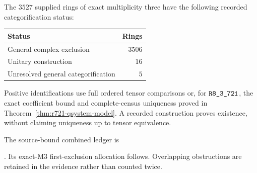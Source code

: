 \begin{theorem}\label{thm:m3-current}
The $3527$ supplied rings of exact multiplicity three have the following
recorded categorification status:
\begin{center}\begin{tabular}{@{}lr@{}}\toprule
Status & Rings\\\midrule
General complex exclusion & $3506$\\
Unitary construction & $16$\\
Unresolved general categorification & $5$\\
\bottomrule\end{tabular}\end{center}
Positive identifications use full ordered tensor comparisons or, for
$\sha{R8_3_721}$, the exact coefficient bound and complete-census uniqueness
proved in Theorem~\ref{thm:r721-qsystem-model}. A recorded construction proves
existence, without claiming uniqueness up to tensor equivalence.
\end{theorem}
The source-bound combined ledger is
\par{}.
Its exact-M3 first-exclusion
allocation follows. Overlapping obstructions are retained in the evidence
rather than counted twice.

